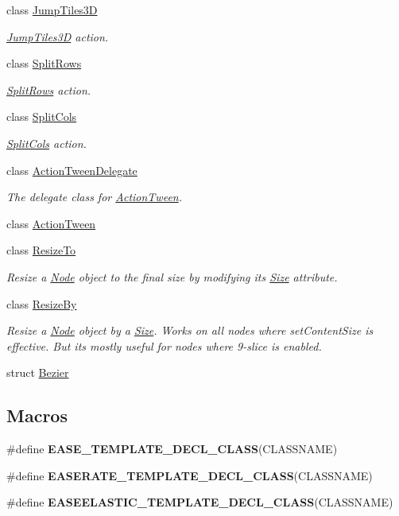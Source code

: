 \begin{DoxyCompactItemize}
class \hyperlink{classJumpTiles3D}{Jump\+Tiles3D}
\begin{DoxyCompactList}\small\item\em \hyperlink{classJumpTiles3D}{Jump\+Tiles3D} action. \end{DoxyCompactList}\item 
class \hyperlink{classSplitRows}{Split\+Rows}
\begin{DoxyCompactList}\small\item\em \hyperlink{classSplitRows}{Split\+Rows} action. \end{DoxyCompactList}\item 
class \hyperlink{classSplitCols}{Split\+Cols}
\begin{DoxyCompactList}\small\item\em \hyperlink{classSplitCols}{Split\+Cols} action. \end{DoxyCompactList}\item 
class \hyperlink{classActionTweenDelegate}{Action\+Tween\+Delegate}
\begin{DoxyCompactList}\small\item\em The delegate class for \hyperlink{classActionTween}{Action\+Tween}. \end{DoxyCompactList}\item 
class \hyperlink{classActionTween}{Action\+Tween}
\item 
class \hyperlink{classResizeTo}{Resize\+To}
\begin{DoxyCompactList}\small\item\em Resize a \hyperlink{classNode}{Node} object to the final size by modifying it\textquotesingle{}s \hyperlink{classSize}{Size} attribute. \end{DoxyCompactList}\item 
class \hyperlink{classResizeBy}{Resize\+By}
\begin{DoxyCompactList}\small\item\em Resize a \hyperlink{classNode}{Node} object by a \hyperlink{classSize}{Size}. Works on all nodes where set\+Content\+Size is effective. But it\textquotesingle{}s mostly useful for nodes where 9-\/slice is enabled. \end{DoxyCompactList}\item 
struct \hyperlink{structBezier}{Bezier}
\end{DoxyCompactItemize}
\subsection*{Macros}
\begin{DoxyCompactItemize}
\item 
\#define {\bfseries E\+A\+S\+E\+\_\+\+T\+E\+M\+P\+L\+A\+T\+E\+\_\+\+D\+E\+C\+L\+\_\+\+C\+L\+A\+SS}(C\+L\+A\+S\+S\+N\+A\+ME)
\item 
\#define {\bfseries E\+A\+S\+E\+R\+A\+T\+E\+\_\+\+T\+E\+M\+P\+L\+A\+T\+E\+\_\+\+D\+E\+C\+L\+\_\+\+C\+L\+A\+SS}(C\+L\+A\+S\+S\+N\+A\+ME)
\item 
\#define {\bfseries E\+A\+S\+E\+E\+L\+A\+S\+T\+I\+C\+\_\+\+T\+E\+M\+P\+L\+A\+T\+E\+\_\+\+D\+E\+C\+L\+\_\+\+C\+L\+A\+SS}(C\+L\+A\+S\+S\+N\+A\+ME)
\end{DoxyCompactItemize}
